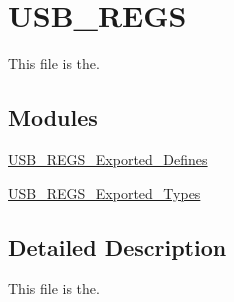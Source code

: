 \hypertarget{group___u_s_b___r_e_g_s}{\section{U\-S\-B\-\_\-\-R\-E\-G\-S}
\label{group___u_s_b___r_e_g_s}
}


This file is the.  


\subsection*{Modules}
\begin{DoxyCompactItemize}
\item 
\hyperlink{group___u_s_b___r_e_g_s___exported___defines}{U\-S\-B\-\_\-\-R\-E\-G\-S\-\_\-\-Exported\-\_\-\-Defines}
\item 
\hyperlink{group___u_s_b___r_e_g_s___exported___types}{U\-S\-B\-\_\-\-R\-E\-G\-S\-\_\-\-Exported\-\_\-\-Types}
\end{DoxyCompactItemize}


\subsection{Detailed Description}
This file is the. 